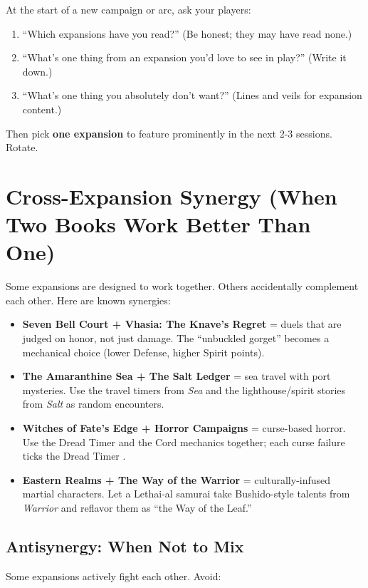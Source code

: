At the start of a new campaign or arc, ask your players:

\begin{enumerate}
\item ``Which expansions have you read?'' (Be honest; they may have read none.)
\item ``What's one thing from an expansion you'd love to see in play?'' (Write it down.)
\item ``What's one thing you absolutely don't want?'' (Lines and veils for expansion content.)
\end{enumerate}

Then pick \textbf{one expansion} to feature prominently in the next 2-3 sessions. Rotate.

\section{Cross-Expansion Synergy (When Two Books Work Better Than One)}

Some expansions are designed to work together. Others accidentally complement each other. Here are known synergies:

\begin{itemize}
\item \textbf{Seven Bell Court + Vhasia: The Knave's Regret} = duels that are judged on honor, not just damage. The ``unbuckled gorget'' becomes a mechanical choice (lower Defense, higher Spirit points).
\item \textbf{The Amaranthine Sea + The Salt Ledger} = sea travel with port mysteries. Use the travel timers from \textit{Sea} and the lighthouse/spirit stories from \textit{Salt} as random encounters.
\item \textbf{Witches of Fate's Edge + Horror Campaigns} = curse-based horror. Use the Dread Timer and the Cord mechanics together; each curse failure ticks the Dread Timer .
\item \textbf{Eastern Realms + The Way of the Warrior} = culturally-infused martial characters. Let a Lethai-al samurai take Bushido-style talents from \textit{Warrior} and reflavor them as ``the Way of the Leaf.''
\end{itemize}

\subsection{Antisynergy: When Not to Mix}

Some expansions actively fight each other. Avoid:

